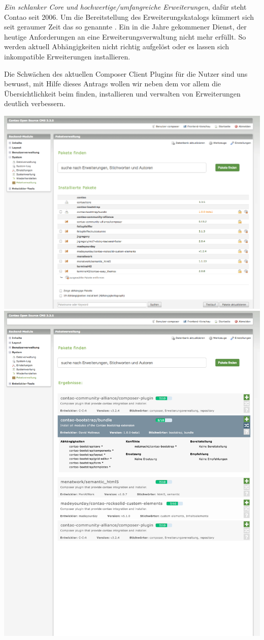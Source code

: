 \documentclass[
paper=a4,
draft=false,%
fontsize=10pt%
]{scrartcl}
\begin{document}
\textit{Ein schlanker Core und hochwertige/umfangreiche Erweiterungen}, dafür steht Contao seit 2006. Um die Bereitstellung des Erweiterungskatalogs kümmert sich seit geraumer Zeit das so genannte . Ein in die Jahre gekommener Dienst, der heutige Anforderungen an eine Erweiterungsverwaltung nicht mehr erfüllt. So werden aktuell Abhängigkeiten nicht richtig aufgelöst oder es lassen sich inkompatible Erweiterungen installieren.

Die Schwächen des aktuellen Composer Client Plugins für die Nutzer sind uns bewusst, mit Hilfe dieses Antrags wollen wir neben dem  vor allem die Übersichtlichkeit beim finden, installieren und verwalten von Erweiterungen deutlich verbessern.

\includegraphics[width=\textwidth]{bilder/composer-search.png}
\includegraphics[width=\textwidth]{bilder/Composer-search-result.png}
\end{document}
